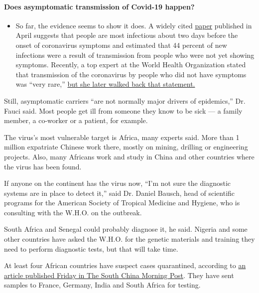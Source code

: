 \begin{itemize}
{  \paragraph{Does asymptomatic transmission of Covid-19
  happen?}\label{does-asymptomatic-transmission-of-covid-19-happen}}

  \begin{itemize}
  \tightlist
  \item
    So far, the evidence seems to show it does. A widely cited
    \href{https://www.nature.com/articles/s41591-020-0869-5}{paper}
    published in April suggests that people are most infectious about
    two days before the onset of coronavirus symptoms and estimated that
    44 percent of new infections were a result of transmission from
    people who were not yet showing symptoms. Recently, a top expert at
    the World Health Organization stated that transmission of the
    coronavirus by people who did not have symptoms was ``very rare,''
    \href{https://www.nytimes3xbfgragh.onion/2020/06/09/world/coronavirus-updates.html?action=click\&pgtype=Article\&state=default\&region=MAIN_CONTENT_3\&context=storylines_faq\#link-1f302e21}{but
    she later walked back that statement.}
  \end{itemize}
\end{itemize}

Still, asymptomatic carriers ``are not normally major drivers of
epidemics,'' Dr. Fauci said. Most people get ill from someone they know
to be sick --- a family member, a co-worker or a patient, for example.

The virus's most vulnerable target is Africa, many experts said. More
than 1 million expatriate Chinese work there, mostly on mining, drilling
or engineering projects. Also, many Africans work and study in China and
other countries where the virus has been found.

If anyone on the continent has the virus now, ``I'm not sure the
diagnostic systems are in place to detect it,'' said Dr. Daniel Bausch,
head of scientific programs for the American Society of Tropical
Medicine and Hygiene, who is consulting with the W.H.O. on the outbreak.

South Africa and Senegal could probably diagnose it, he said. Nigeria
and some other countries have asked the W.H.O. for the genetic materials
and training they need to perform diagnostic tests, but that will take
time.

At least four African countries have suspect cases quarantined,
according to
\href{https://www.scmp.com/news/china/article/3048310/china-coronavirus-african-nations-quarantine-symptomatic-passengers}{an
article published Friday in The South China Morning Post}. They have
sent samples to France, Germany, India and South Africa for testing.

